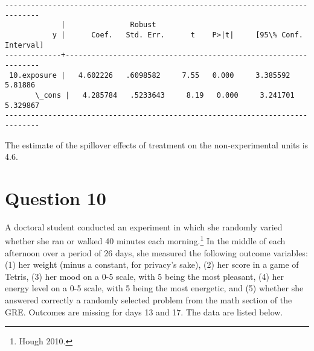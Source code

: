 \documentclass[11pt,notitlepage]{article}\usepackage[]{graphicx}\usepackage[]{color}
\makeatletter
\newenvironment{kframe}{%
 \def\at@end@of@kframe{}%
 \ifinner\ifhmode%
  \def\at@end@of@kframe{\end{minipage}}%
  \begin{minipage}{\columnwidth}%
 \fi\fi%
 \def\FrameCommand##1{\hskip\@totalleftmargin \hskip-\fboxsep
 \colorbox{shadecolor}{##1}\hskip-\fboxsep
     \hskip-\linewidth \hskip-\@totalleftmargin \hskip\columnwidth}%
 \MakeFramed {\advance\hsize-\width
   \@totalleftmargin\z@ \linewidth\hsize
   \@setminipage}}%
 {\par\unskip\endMakeFramed%
 \at@end@of@kframe}
\newenvironment{knitrout}{}{} %
\makeatother
\begin{document}
\begin{enumerate}[a)]
\begin{knitrout}
\begin{kframe}
\begin{Verbatim}[commandchars=\\\{\}]
------------------------------------------------------------------------------
             |               Robust
           y |      Coef.   Std. Err.      t    P>|t|     [95\% Conf. Interval]
-------------+----------------------------------------------------------------
 10.exposure |   4.602226   .6098582     7.55   0.000     3.385592     5.81886
       \_cons |   4.285784   .5233643     8.19   0.000     3.241701    5.329867
------------------------------------------------------------------------------

    \end{Verbatim}
\end{kframe}
\end{knitrout}
 
\end{enumerate}

The estimate of the spillover effects of treatment on the non-experimental units is 4.6.


\section*{Question 10}
A doctoral student conducted an experiment in which she randomly varied whether she ran or walked 40 minutes each morning.\footnote{Hough 2010.} In the middle of each afternoon over a period of 26 days, she measured the following outcome variables: (1) her weight (minus a constant, for privacy's sake), (2) her score in a game of Tetris, (3) her mood on a 0-5 scale, with 5 being the most pleasant, (4) her energy level on a 0-5 scale, with 5 being the most energetic, and (5) whether she answered correctly a randomly selected problem from the math section of the GRE. Outcomes are missing for days 13 and 17. The data are listed below.
\end{document}
